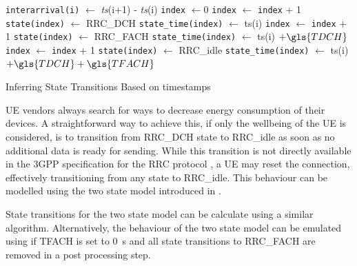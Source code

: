 \begin{algorithm}
  \begin{algorithmic}
    \State \texttt{interarrival(i)} $\leftarrow$ \emph{ts}(i+1) - \emph{ts}(i)
    \State \texttt{index} $\leftarrow 0$
        \State \texttt{index} $\leftarrow$ \texttt{index} + 1
        \State \texttt{state(index)} $\leftarrow$ \gls{RRC_DCH}
        \State \texttt{state\_time(index)} $\leftarrow$ ts(i)
      \EndIf
        \State \texttt{index} $\leftarrow$ \texttt{index} + 1
        \State \texttt{state(index)} $\leftarrow$ \gls{RRC_FACH}
        \State \texttt{state\_time(index)} $\leftarrow$ ts(i) $+ \gls{TDCH}$
      \EndIf
        \State \texttt{index} $\leftarrow$ \texttt{index} + 1
        \State \texttt{state(index)} $\leftarrow$ \gls{RRC_idle}
        \State \texttt{state\_time(index)} $\leftarrow$ ts(i) $+ \gls{TDCH} + \gls{TFACH}$
      \EndIf
    \EndFor
  \end{algorithmic}
  \caption{Inferring  State Transitions Based on  timestamps}
  \label{alg:network:network_traces:performance_evaluation:inferring_network_state:inference_algorithm}
\end{algorithm}

\gls{UE} vendors always search for ways to decrease energy consumption of their devices.
A straightforward way to achieve this, if only the wellbeing of the \gls{UE} is considered, is to transition from \gls{RRC_DCH} state to \gls{RRC_idle} as soon as no additional data is ready for sending.
While this transition is not directly available in the 3GPP specification for the \gls{RRC} protocol \cite{3GPP_RRC_Spec}, a \gls{UE} may reset the connection, effectively transitioning from any state to \gls{RRC_idle}.
This behaviour can be modelled using the two state model introduced in .

State transitions for the two state model can be calculate using a similar algorithm.
Alternatively, the behaviour of the two state model can be emulated using  if \gls{TFACH} is set to \SI{0}{\second} and all state transitions to \gls{RRC_FACH} are removed in a post processing step.

